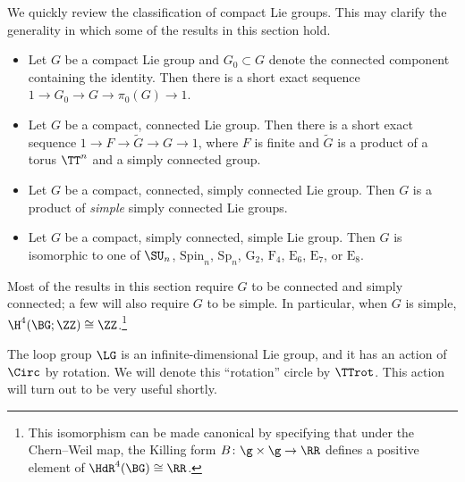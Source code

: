 \begin{remark}
We quickly review the classification of compact Lie groups. This may clarify the generality in which some of the
results in this section hold.
\begin{itemize}
	\item Let $G$ be a compact Lie group and $G_0\subset G$ denote the connected component containing the identity.
	Then there is a short exact sequence $1\to G_0\to G\to \pi_0(G)\to 1$.
	\item Let $G$ be a compact, connected Lie group. Then there is a short exact sequence $1\to F \to\tilde G\to
	G\to 1$, where $F$ is finite and $\tilde G$ is a product of a torus $\TT^n$ and a simply connected group.
	\item Let $G$ be a compact, connected, simply connected Lie group. Then $G$ is a product of \emph{simple}
	simply connected Lie groups.
	\item Let $G$ be a compact, simply connected, simple Lie group. Then $G$ is isomorphic to one of
	$\SU_n$, $\mathrm{Spin}_n$, $\mathrm{Sp}_n$, $\mathrm G_2$, $\mathrm F_4$, $\mathrm E_6$,
	$\mathrm E_7$, or $\mathrm
	E_8$.
	 
\end{itemize}
Most of the results in this section require $G$ to be connected and simply connected; a few will also require $G$
to be simple. In particular, when $G$ is simple, $\H^4(\BG;\ZZ)\cong\ZZ$.\footnote{This isomorphism can be made
canonical by specifying that under the Chern--Weil map, the Killing form $B\colon\g\times\g\to\RR$ defines a
positive element of $\HdR^4(\BG)\cong\RR$.}
\end{remark}
\begin{remark}
	The loop group $\LG$ is an infinite-dimensional Lie group, and it has an
	action of $\Circ$ by rotation. We will denote this ``rotation'' circle by
	$\TTrot$.  This action will turn out to be very useful shortly.
\end{remark}

